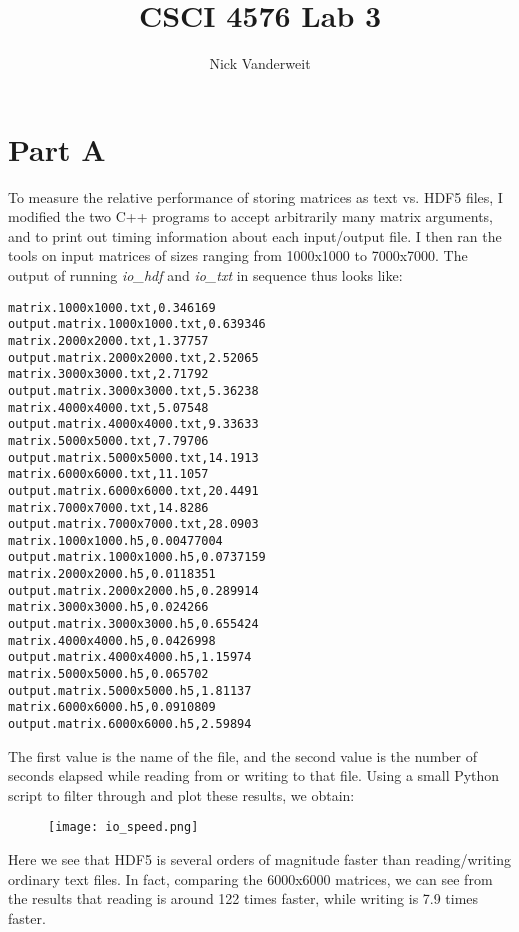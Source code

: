 \documentclass{article}
\title{CSCI 4576 Lab 3}
\author{Nick Vanderweit}
\begin{document}
\maketitle
\section*{Part A}
To measure the relative performance of storing matrices as text vs. HDF5 files,
I modified the two C++ programs to accept arbitrarily many matrix arguments,
and to print out timing information about each input/output file. I then ran
the tools on input matrices of sizes ranging from 1000x1000 to 7000x7000. The
output of running \emph{io\_hdf} and \emph{io\_txt} in sequence thus looks
like:

\begin{verbatim}
matrix.1000x1000.txt,0.346169
output.matrix.1000x1000.txt,0.639346
matrix.2000x2000.txt,1.37757
output.matrix.2000x2000.txt,2.52065
matrix.3000x3000.txt,2.71792
output.matrix.3000x3000.txt,5.36238
matrix.4000x4000.txt,5.07548
output.matrix.4000x4000.txt,9.33633
matrix.5000x5000.txt,7.79706
output.matrix.5000x5000.txt,14.1913
matrix.6000x6000.txt,11.1057
output.matrix.6000x6000.txt,20.4491
matrix.7000x7000.txt,14.8286
output.matrix.7000x7000.txt,28.0903
matrix.1000x1000.h5,0.00477004
output.matrix.1000x1000.h5,0.0737159
matrix.2000x2000.h5,0.0118351
output.matrix.2000x2000.h5,0.289914
matrix.3000x3000.h5,0.024266
output.matrix.3000x3000.h5,0.655424
matrix.4000x4000.h5,0.0426998
output.matrix.4000x4000.h5,1.15974
matrix.5000x5000.h5,0.065702
output.matrix.5000x5000.h5,1.81137
matrix.6000x6000.h5,0.0910809
output.matrix.6000x6000.h5,2.59894
\end{verbatim}

The first value is the name of the file, and the second value is the number of
seconds elapsed while reading from or writing to that file. Using a small
Python script to filter through and plot these results, we obtain:

\begin{figure}[h!]
\texttt{[image: io\_speed.png]}
\end{figure}

Here we see that HDF5 is several orders of magnitude faster than reading/writing
ordinary text files. In fact, comparing the 6000x6000 matrices, we can see
from the results that reading is around 122 times faster, while writing is 7.9
times faster.
\end{document}
